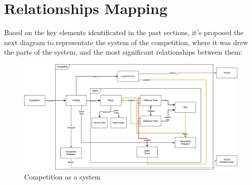 \graphicspath{{lozano/}}

\section{Relationships Mapping}

Based on the key elements identificated in the past sections, it's proposed the next diagram to representate the system of the competition, where it was drew the parts of the system, and the most significant relationships between them:

\begin{figure}
    \centering
    \includegraphics[width=\linewidth]{SystemMapping} 
    \caption{Competition as a system}
\end{figure}

